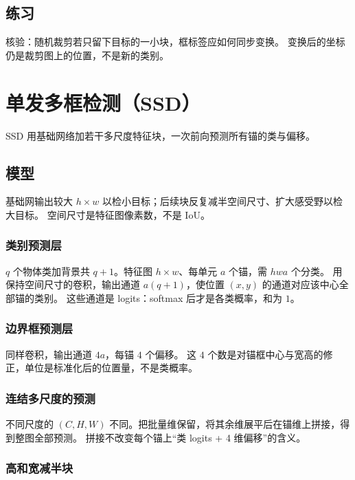 \subsection{练习}

核验：随机裁剪若只留下目标的一小块，框标签应如何同步变换。
变换后的坐标仍是裁剪图上的位置，不是新的类别。

\section{单发多框检测（SSD）}



SSD 用基础网络加若干多尺度特征块，一次前向预测所有锚的类与偏移。

\subsection{模型}

基础网输出较大 $h\times w$ 以检小目标；后续块反复减半空间尺寸、扩大感受野以检大目标。
空间尺寸是特征图像素数，不是 IoU。

\subsubsection{类别预测层}

$q$ 个物体类加背景共 $q+1$。特征图 $h\times w$、每单元 $a$ 个锚，需 $hwa$ 个分类。
用保持空间尺寸的卷积，输出通道 $a(q+1)$，使位置 $(x,y)$ 的通道对应该中心全部锚的类别。
这些通道是 logits：softmax 后才是各类概率，和为 $1$。

\subsubsection{边界框预测层}

同样卷积，输出通道 $4a$，每锚 $4$ 个偏移。
这 $4$ 个数是对锚框中心与宽高的修正，单位是标准化后的位置量，不是类概率。

\subsubsection{连结多尺度的预测}

不同尺度的 $(C,H,W)$ 不同。把批量维保留，将其余维展平后在锚维上拼接，得到整图全部预测。
拼接不改变每个锚上“类 logits + 4 维偏移”的含义。

\subsubsection{高和宽减半块}

